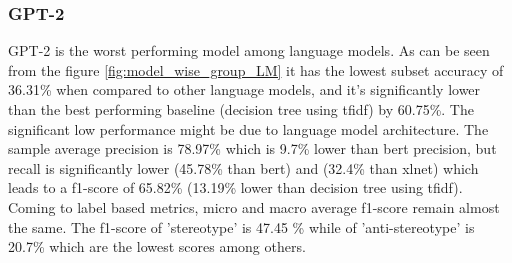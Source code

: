 \subsubsection{GPT-2}
GPT-2 is the worst performing model among language models. As can be seen from the figure \ref{fig:model_wise_group_LM} it has the lowest subset accuracy of 36.31\% when compared to other language models, and it's significantly lower than the best performing baseline (decision tree using \acrshort{tfidf}) by 60.75\%. The significant low performance might be due to language model architecture. 
The sample average precision is 78.97\% which is 9.7\% lower than bert precision, but recall is significantly lower (45.78\% than bert) and  (32.4\% than xlnet) which leads to a f1-score of 65.82\% (13.19\% lower than decision tree using \acrshort{tfidf}). Coming to label based metrics, micro and macro average f1-score remain almost the same. The f1-score of 'stereotype' is 47.45 \% while of 'anti-stereotype' is 20.7\% which are the lowest scores among others. 


